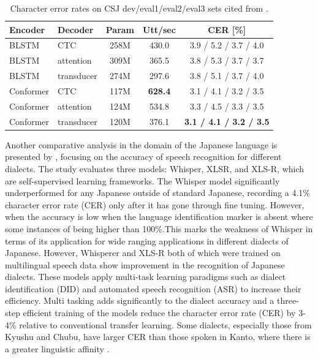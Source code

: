 \begin{table}[h!]
    \centering
    \caption{Character error rates on CSJ dev/eval1/eval2/eval3 sets cited from \cite{Karita2021}.}
    \begin{tabular}{l|l|c|c|c}
    \hline
    \textbf{Encoder}   & \textbf{Decoder}   & \textbf{Param} & \textbf{Utt/sec} & \textbf{CER [\%]} \\ \hline
    BLSTM              & CTC               & 258M             & 430.0            & 3.9 / 5.2 / 3.7 / 4.0 \\ 
    BLSTM              & attention         & 309M             & 365.5            & 3.8 / 5.3 / 3.7 / 3.7 \\ 
    BLSTM              & transducer        & 274M             & 297.6            & 3.8 / 5.1 / 3.7 / 4.0 \\ 
    Conformer          & CTC               & 117M             & \textbf{628.4}   & 3.1 / 4.1 / 3.2 / 3.5 \\ 
    Conformer          & attention         & 124M             & 534.8            & 3.3 / 4.5 / 3.3 / 3.5 \\ 
    Conformer          & transducer        & 120M             & 376.1            & \textbf{3.1 / 4.1 / 3.2 / 3.5} \\ \hline
    \end{tabular}
    \label{tab:cer_comparison}
    \end{table}

Another comparative analysis in the domain of the Japanese language is presented by \textcite{takahashi2024comparison}, focusing on the accuracy of speech recognition for different dialects. The study evaluates three models: Whisper, XLSR, and XLS-R, which are self-supervised learning frameworks. The Whisper model significantly underperformed for any Japanese outside of standard Japanese, recording a 4.1\% character error rate (CER) only after it has gone through fine tuning. However, when the accuracy is low when the language identification marker is absent where some instances of being higher than 100\%.This marks the weakness of Whisper in terms of its application for wide ranging applications in different dialects of Japanese. However, Whisperer and XLS-R both of which were trained on multilingual speech data show improvement in the recognition of Japanese dialects. These models apply multi-task learning paradigms such as dialect identification (DID) and automated speech recognition (ASR) to increase their efficiency. Multi tasking adds significantly to the dialect accuracy and a three-step efficient training of the models reduce the character error rate (CER) by 3-4\% relative to conventional transfer learning. Some dialects, especially those from Kyushu and Chubu, have larger CER than those spoken in Kanto, where there is a greater linguistic affinity \parencite{takahashi2024comparison}.

